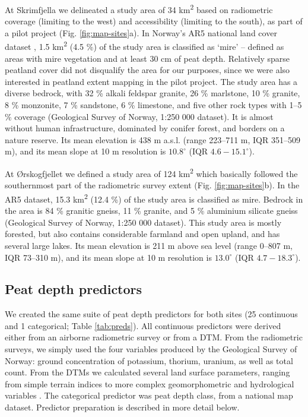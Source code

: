 \documentclass[soil, manuscript]{copernicus}
\begin{document}
At Skrimfjella we delineated a study area of 34 km\textsuperscript{2} based on radiometric coverage (limiting to the west) and accessibility (limiting to the south), as part of a pilot project (Fig. \ref{fig:map-sites}a).
In Norway's AR5 national land cover dataset \citep[``areal resources in scale 1:5000'',][]{ahlstromAR5Klassifikasjonssystem2019}, 1.5 km\textsuperscript{2} (4.5 \%) of the study area is classified as `mire' -- defined as areas with mire vegetation and at least 30 cm of peat depth.
Relatively sparse peatland cover did not disqualify the area for our purposes, since we were also interested in peatland extent mapping in the pilot project.
The study area has a diverse bedrock, with 32 \% alkali feldspar granite, 26 \% marlstone, 10 \% granite, 8 \% monzonite, 7 \% sandstone, 6 \% limestone, and five other rock types with 1--5 \% coverage (Geological Survey of Norway, 1:250 000 dataset).
It is almost without human infrastructure, dominated by conifer forest, and borders on a nature reserve.
Its mean elevation is 438 m a.s.l. (range 223--711 m, IQR 351--509 m), and its mean slope at 10 m resolution is \(10.8^\circ\) (IQR \(4.6-15.1^\circ\)).

At Ørskogfjellet we defined a study area of 124 km\textsuperscript{2} which basically followed the southernmost part of the radiometric survey extent (Fig. \ref{fig:map-sites}b).
In the AR5 dataset, 15.3 km\textsuperscript{2} (12.4 \%) of the study area is classified as mire.
Bedrock in the area is 84 \% granitic gneiss, 11 \% granite, and 5 \% aluminium silicate gneiss (Geological Survey of Norway, 1:250 000 dataset).
This study area is mostly forested, but also contains considerable farmland and open upland, and has several large lakes.
Its mean elevation is 211 m above sea level (range 0--807 m, IQR 73--310 m), and its mean slope at 10 m resolution is \(13.0^\circ\) (IQR \(4.7-18.3^\circ\)).

\subsection{Peat depth predictors}

We created the same suite of peat depth predictors for both sites (25 continuous and 1 categorical; Table \ref{tab:preds}).
All continuous predictors were derived either from an airborne radiometric survey or from a DTM.
From the radiometric surveys, we simply used the four variables produced by the Geological Survey of Norway: ground concentration of potassium, thorium, uranium, as well as total count.
From the DTMs we calculated several land surface parameters, ranging from simple terrain indices to more complex geomorphometric and hydrological variables \citep{maxwellLandsurfaceParametersSpatial2022}.
The categorical predictor was peat depth class, from a national map dataset.
Predictor preparation is described in more detail below.
\end{document}
